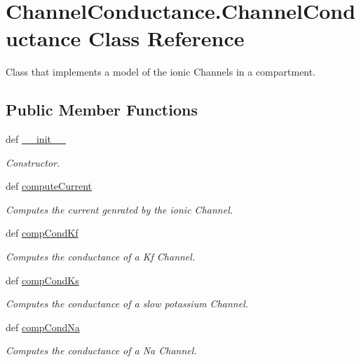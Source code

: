 \hypertarget{class_channel_conductance_1_1_channel_conductance}{\section{Channel\-Conductance.\-Channel\-Conductance Class Reference}
\label{class_channel_conductance_1_1_channel_conductance}
}


Class that implements a model of the ionic Channels in a compartment.  


\subsection*{Public Member Functions}
\begin{DoxyCompactItemize}
\item 
def \hyperlink{class_channel_conductance_1_1_channel_conductance_adaaf5ea399963a716dc532a060964348}{\-\_\-\-\_\-init\-\_\-\-\_\-}
\begin{DoxyCompactList}\small\item\em Constructor. \end{DoxyCompactList}\item 
def \hyperlink{class_channel_conductance_1_1_channel_conductance_abde599b9096579b94d24295678f45b6d}{compute\-Current}
\begin{DoxyCompactList}\small\item\em Computes the current genrated by the ionic Channel. \end{DoxyCompactList}\item 
def \hyperlink{class_channel_conductance_1_1_channel_conductance_a956928953c88e1c03c113fc98ec42cc6}{comp\-Cond\-Kf}
\begin{DoxyCompactList}\small\item\em Computes the conductance of a Kf Channel. \end{DoxyCompactList}\item 
def \hyperlink{class_channel_conductance_1_1_channel_conductance_a19cc2a71f96187c7c647855d586cecaa}{comp\-Cond\-Ks}
\begin{DoxyCompactList}\small\item\em Computes the conductance of a slow potassium Channel. \end{DoxyCompactList}\item 
def \hyperlink{class_channel_conductance_1_1_channel_conductance_a26e6cf970cc7a8732f590dceb1d7c993}{comp\-Cond\-Na}
\begin{DoxyCompactList}\small\item\em Computes the conductance of a Na Channel. \end{DoxyCompactList}\end{DoxyCompactItemize}
